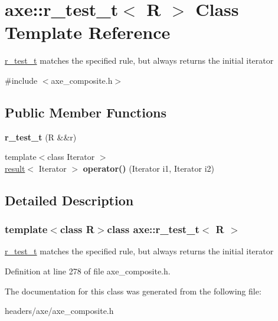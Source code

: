 \hypertarget{classaxe_1_1r__test__t}{\section{axe\+:\+:r\+\_\+test\+\_\+t$<$ R $>$ Class Template Reference}
\label{classaxe_1_1r__test__t}
}


\hyperlink{classaxe_1_1r__test__t}{r\+\_\+test\+\_\+t} matches the specified rule, but always returns the initial iterator  




{\ttfamily \#include $<$axe\+\_\+composite.\+h$>$}

\subsection*{Public Member Functions}
\begin{DoxyCompactItemize}
\item 
\hypertarget{classaxe_1_1r__test__t_a0b27ed80d8f118381b0782936ce96ead}{{\bfseries r\+\_\+test\+\_\+t} (R \&\&r)}\label{classaxe_1_1r__test__t_a0b27ed80d8f118381b0782936ce96ead}

\item 
\hypertarget{classaxe_1_1r__test__t_a25db337066dfb4aefa6bd9edd8a042fd}{{\footnotesize template$<$class Iterator $>$ }\\\hyperlink{structaxe_1_1result}{result}$<$ Iterator $>$ {\bfseries operator()} (Iterator i1, Iterator i2)}\label{classaxe_1_1r__test__t_a25db337066dfb4aefa6bd9edd8a042fd}

\end{DoxyCompactItemize}


\subsection{Detailed Description}
\subsubsection*{template$<$class R$>$class axe\+::r\+\_\+test\+\_\+t$<$ R $>$}

\hyperlink{classaxe_1_1r__test__t}{r\+\_\+test\+\_\+t} matches the specified rule, but always returns the initial iterator 

Definition at line 278 of file axe\+\_\+composite.\+h.



The documentation for this class was generated from the following file\+:\begin{DoxyCompactItemize}
\item 
headers/axe/axe\+\_\+composite.\+h\end{DoxyCompactItemize}
